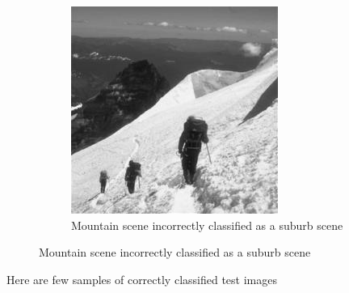 \begin{homeworkProblem}
\begin{figure}[H]
  \begin{subfigure}{0.5\textwidth}
    \centering
    \includegraphics[width=.5\linewidth]{./images/4_surb.jpg}
    \caption{Mountain scene incorrectly classified as a suburb scene}
  \end{subfigure}
\end{figure}

\pagebreak
Here are few samples of correctly classified test images
\\



\end{homeworkProblem}

